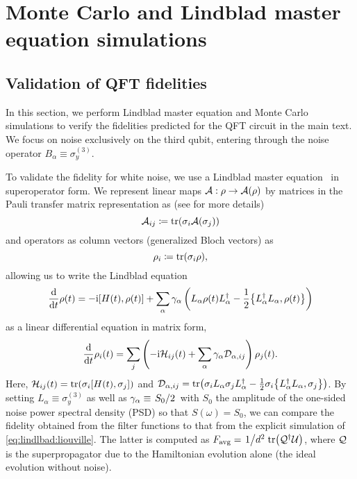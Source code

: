 \chapter{Monte Carlo and Lindblad master equation simulations}\label{ch:filter_functions:time_domain_methods}
\section{Validation of QFT fidelities}
In this section, we perform Lindblad master equation and Monte Carlo simulations to verify the fidelities predicted for the QFT circuit in the main text.
We focus on noise exclusively on the third qubit, entering through the noise operator $B_\alpha\equiv\sigma_y^{(3)}$.

To validate the fidelity for white noise, we use a Lindblad master equation~\cite{Lindblad1976,Gorini1976} in superoperator form.
We represent linear maps $\mathcal{A}: \rho\rightarrow\mathcal{A}(\rho)$ by matrices in the Pauli transfer matrix representation as (see  for more details)
\begin{equation}
    \mathcal{A}_{ij} \coloneqq \tr(\sigma_i\mathcal{A}(\sigma_j))
\end{equation}
and operators as column vectors (\ie generalized Bloch vectors) as
\begin{equation}\label{eq:bloch_vector}
\rho_i \coloneqq \tr(\sigma_i\rho),
\end{equation}
allowing us to write the Lindblad equation
\begin{equation}\label{eq:lindblad:hilbert}
\dv{t}\rho(t) = -\i\comm{H(t)}{\rho(t)} + \sum_\alpha \gamma_\alpha\left(L_\alpha\rho(t) L_\alpha\adjoint - \frac{1}{2}\acomm{L_\alpha\adjoint L_\alpha}{\rho(t)}\right)
\end{equation}
as a linear differential equation in matrix form,
\begin{equation}\label{eq:lindlbad:liouville}
\dv{t}\rho_i(t) = \sum_j\left(-\mathrm{i}\mathcal{H}_{ij}(t)+ \sum_\alpha \gamma_\alpha \mathcal{D}_{\alpha, ij}\right)\rho_j(t).
\end{equation}
Here, $\mc{H}_{ij}(t) = \tr(\sigma_i\comm{H(t)}{\sigma_j})$ and $\mc{D}_{\alpha, ij} = \tr(\sigma_i L_\alpha\sigma_j L_\alpha\adjoint - \frac{1}{2}\sigma_i \acomm{L_\alpha\adjoint L_\alpha}{\sigma_j})$.
By setting $L_\alpha\equiv\sigma_y^{(3)}$ as well as $\gamma_\alpha\equiv\flatfrac{S_0}{2}$ with $S_0$ the amplitude of the one-sided noise power spectral density (PSD) so that $S(\omega) = S_0$, we can compare the fidelity obtained from the filter functions to that from the explicit simulation of \cref{eq:lindlbad:liouville}.
The latter is computed as $\avgfid = \flatfrac{1}{d^2}\tr(\mc{Q}\adjoint\mc{U})$, where $\mathcal{Q}$ is the superpropagator due to the Hamiltonian evolution alone (\ie the ideal evolution without noise).

